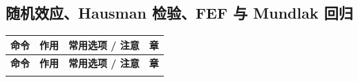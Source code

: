 \subsection{随机效应、Hausman 检验、FEF 与 Mundlak 回归}

{\renewcommand{\arraystretch}{1.12}\begin{longtable}{@{}>{\raggedright\arraybackslash\small}p{5.3cm}>{\raggedright\arraybackslash\small}p{3.8cm}>{\raggedright\arraybackslash\small}p{5.3cm}>{\centering\arraybackslash\small}p{0.9cm}@{}}
\toprule
\textbf{命令} & \textbf{作用} & \textbf{常用选项 / 注意} & \textbf{章}\\
\midrule
\endfirsthead
\toprule
\textbf{命令} & \textbf{作用} & \textbf{常用选项 / 注意} & \textbf{章}\\
\midrule
\endhead
\bottomrule
\endlastfoot


\end{longtable}}
